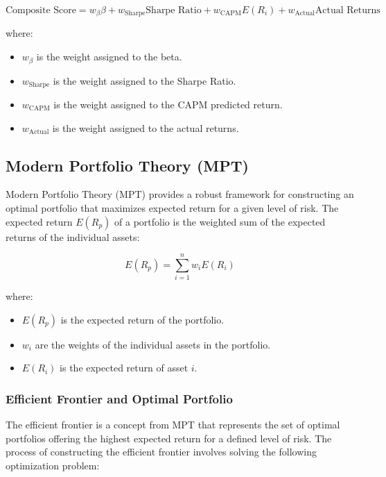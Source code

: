 \begin{equation}
\text{Composite Score} = w_{\beta} \beta + w_{\text{Sharpe}} \text{Sharpe Ratio} + w_{\text{CAPM}} E(R_i) + w_{\text{Actual}} \text{Actual Returns}
\end{equation}

where:
\begin{itemize}
    \item $w_{\beta}$ is the weight assigned to the beta.
    \item $w_{\text{Sharpe}}$ is the weight assigned to the Sharpe Ratio.
    \item $w_{\text{CAPM}}$ is the weight assigned to the CAPM predicted return.
    \item $w_{\text{Actual}}$ is the weight assigned to the actual returns.
\end{itemize}




\subsection{Modern Portfolio Theory (MPT)}
Modern Portfolio Theory (MPT) provides a robust framework for constructing an optimal portfolio that maximizes expected return for a given level of risk. The expected return $E(R_p)$ of a portfolio is the weighted sum of the expected returns of the individual assets:

\begin{equation}
E(R_p) = \sum_{i=1}^n w_iE(R_i)
\end{equation}

where:
\begin{itemize}
    \item $E(R_p)$ is the expected return of the portfolio.
    \item $w_i$ are the weights of the individual assets in the portfolio.
    \item $E(R_i)$ is the expected return of asset $i$.
\end{itemize}

\subsubsection{Efficient Frontier and Optimal Portfolio}
The efficient frontier is a concept from MPT that represents the set of optimal portfolios offering the highest expected return for a defined level of risk. The process of constructing the efficient frontier involves solving the following optimization problem:

